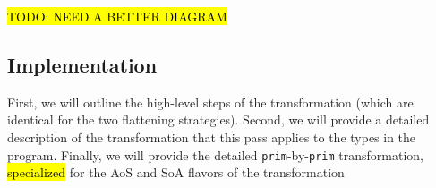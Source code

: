 \documentclass[leqno,11pt]{article}
\begin{document}


\hl{TODO: NEED A BETTER DIAGRAM}

\subsection{Implementation}






First, we will outline the high-level steps of the transformation (which are
identical for the two flattening strategies). Second, we will provide a detailed
description of the transformation that this pass applies to the types in the
program. Finally, we will provide the detailed \texttt{prim}-by-\texttt{prim}
transformation, \hl{specialized} for the AoS and SoA flavors of the
transformation
\end{document}
